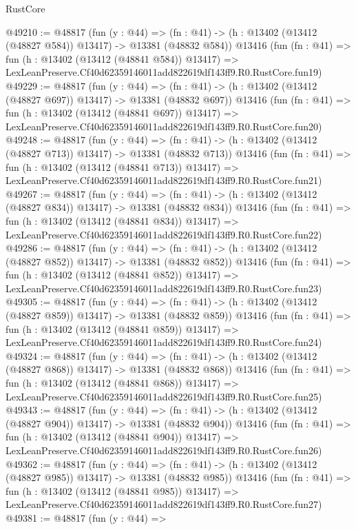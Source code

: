 \begin{lexlean}{RustCore}
\begin{coremodule}
@49210 := @48817
    (fun (y : @44) =>
    (fn : @41) -> (h : @13402 (@13412 (@48827 @584)) @13417) -> @13381 (@48832 @584))
    @13416
    (fun (fn : @41) =>
    fun (h : @13402 (@13412 (@48841 @584)) @13417) =>
    LexLeanPreserve.Cf40d62359146011add822619df143ff9.R0.RustCore.fun19)
@49229 := @48817
    (fun (y : @44) =>
    (fn : @41) -> (h : @13402 (@13412 (@48827 @697)) @13417) -> @13381 (@48832 @697))
    @13416
    (fun (fn : @41) =>
    fun (h : @13402 (@13412 (@48841 @697)) @13417) =>
    LexLeanPreserve.Cf40d62359146011add822619df143ff9.R0.RustCore.fun20)
@49248 := @48817
    (fun (y : @44) =>
    (fn : @41) -> (h : @13402 (@13412 (@48827 @713)) @13417) -> @13381 (@48832 @713))
    @13416
    (fun (fn : @41) =>
    fun (h : @13402 (@13412 (@48841 @713)) @13417) =>
    LexLeanPreserve.Cf40d62359146011add822619df143ff9.R0.RustCore.fun21)
@49267 := @48817
    (fun (y : @44) =>
    (fn : @41) -> (h : @13402 (@13412 (@48827 @834)) @13417) -> @13381 (@48832 @834))
    @13416
    (fun (fn : @41) =>
    fun (h : @13402 (@13412 (@48841 @834)) @13417) =>
    LexLeanPreserve.Cf40d62359146011add822619df143ff9.R0.RustCore.fun22)
@49286 := @48817
    (fun (y : @44) =>
    (fn : @41) -> (h : @13402 (@13412 (@48827 @852)) @13417) -> @13381 (@48832 @852))
    @13416
    (fun (fn : @41) =>
    fun (h : @13402 (@13412 (@48841 @852)) @13417) =>
    LexLeanPreserve.Cf40d62359146011add822619df143ff9.R0.RustCore.fun23)
@49305 := @48817
    (fun (y : @44) =>
    (fn : @41) -> (h : @13402 (@13412 (@48827 @859)) @13417) -> @13381 (@48832 @859))
    @13416
    (fun (fn : @41) =>
    fun (h : @13402 (@13412 (@48841 @859)) @13417) =>
    LexLeanPreserve.Cf40d62359146011add822619df143ff9.R0.RustCore.fun24)
@49324 := @48817
    (fun (y : @44) =>
    (fn : @41) -> (h : @13402 (@13412 (@48827 @868)) @13417) -> @13381 (@48832 @868))
    @13416
    (fun (fn : @41) =>
    fun (h : @13402 (@13412 (@48841 @868)) @13417) =>
    LexLeanPreserve.Cf40d62359146011add822619df143ff9.R0.RustCore.fun25)
@49343 := @48817
    (fun (y : @44) =>
    (fn : @41) -> (h : @13402 (@13412 (@48827 @904)) @13417) -> @13381 (@48832 @904))
    @13416
    (fun (fn : @41) =>
    fun (h : @13402 (@13412 (@48841 @904)) @13417) =>
    LexLeanPreserve.Cf40d62359146011add822619df143ff9.R0.RustCore.fun26)
@49362 := @48817
    (fun (y : @44) =>
    (fn : @41) -> (h : @13402 (@13412 (@48827 @985)) @13417) -> @13381 (@48832 @985))
    @13416
    (fun (fn : @41) =>
    fun (h : @13402 (@13412 (@48841 @985)) @13417) =>
    LexLeanPreserve.Cf40d62359146011add822619df143ff9.R0.RustCore.fun27)
@49381 := @48817
    (fun (y : @44) =>

\end{coremodule}
\end{lexlean}
